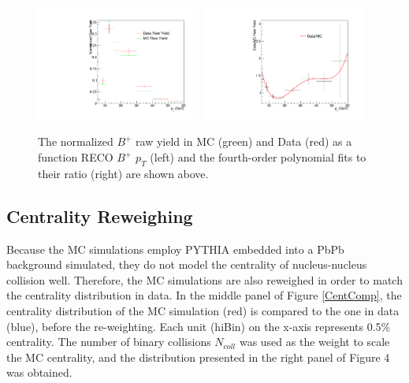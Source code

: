 \begin{figure}[h]
\begin{center}
\includegraphics[width= 0.48\textwidth]{Figures/Chapter5/BPBptDataMC1.pdf}
\includegraphics[width= 0.48\textwidth]{Figures/Chapter5/BPBptDataMC2.pdf}
\caption{The normalized $B^+$ raw yield in MC (green) and Data (red) as a function RECO $B^+$ $p_T$ (left) and the fourth-order polynomial fits to their ratio (right) are shown above.}
\label{BPBptWeight}
\end{center}
\end{figure}


\subsection{Centrality Reweighing}

Because the MC simulations employ PYTHIA embedded into a PbPb background simulated, they do not model the centrality of nucleus-nucleus collision well. Therefore, the MC simulations are also reweighed in order to match the centrality distribution in data. In the middle panel of Figure \ref{CentComp}, the centrality distribution of the MC simulation (red) is compared to the one in data (blue), before the re-weighting. Each unit (hiBin) on the x-axis represents 0.5\% centrality. The number of binary collisions $N_{coll}$ was used as the weight to scale the MC centrality, and the distribution presented in the right panel of Figure 4 was obtained. 

